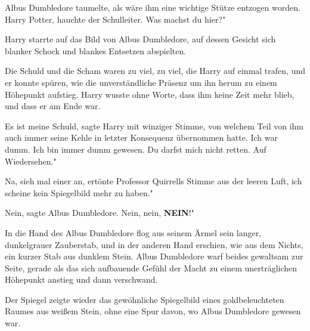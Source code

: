 Albus Dumbledore taumelte, als wäre ihm eine wichtige Stütze entzogen worden.
\glqq Harry Potter\grqq{}, hauchte der Schulleiter. \glqq Was machst du hier?"

Harry starrte auf das Bild von Albus Dumbledore, auf dessen Gesicht sich blanker
Schock und blankes Entsetzen abspielten.

Die Schuld und die Scham waren zu viel, zu viel, die Harry auf einmal trafen,
und er konnte spüren, wie die unverständliche Präsenz um ihn herum zu einem
Höhepunkt aufstieg. Harry wusste ohne Worte, dass ihm keine Zeit mehr blieb, und
dass er am Ende war.

\glqq Es ist meine Schuld\grqq{}, sagte Harry mit winziger Stimme, von welchem
Teil von ihm auch immer seine Kehle in letzter Konsequenz übernommen hatte.
\glqq Ich war dumm. Ich bin immer dumm gewesen. Du darfst mich nicht retten. Auf
Wiedersehen."

\glqq Na, sieh mal einer an\grqq{}, ertönte Professor Quirrells Stimme aus der
leeren Luft, \glqq ich scheine kein Spiegelbild mehr zu haben."

\glqq Nein\grqq{}, sagte Albus Dumbledore. \glqq Nein, nein, \textbf{NEIN}!"

In die Hand des Albus Dumbledore flog aus seinem Ärmel sein langer, dunkelgrauer
Zauberstab, und in der anderen Hand erschien, wie aus dem Nichts, ein kurzer
Stab aus dunklem Stein. Albus Dumbledore warf beides gewaltsam zur Seite, gerade
als das sich aufbauende Gefühl der Macht zu einem unerträglichen Höhepunkt
anstieg und dann verschwand.

Der Spiegel zeigte wieder das gewöhnliche Spiegelbild eines goldbeleuchteten
Raumes aus weißem Stein, ohne eine Spur davon, wo Albus Dumbledore gewesen war.

